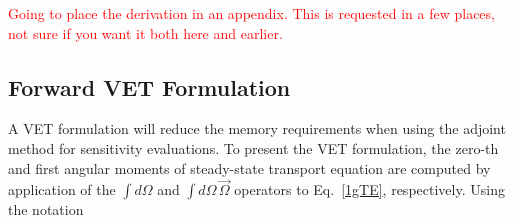 \documentclass[12pt]{report}
\newcommand{\vO}{\vec{\Omega}}
\newcommand{\comment}[2]{\marginpar{\textcolor{#2}{$\star$}}\textcolor{#2}{#1}\newline}
\newcommand{\iwh}[1]{\comment{#1}{red}}
\newcommand{\iwh}[1]{\phantom{a}}
\begin{document}
\iwh{Going to place the derivation in an appendix. This is requested in a few places, not sure if you want it both here and earlier.}

\subsection{Forward VET Formulation}

A VET formulation will reduce the memory requirements when using the adjoint method for sensitivity evaluations. To present the VET formulation, the zero-th and first angular moments of steady-state transport equation are computed by application of the $\int d \Omega$ and $\int d \Omega \, \vO$ operators to Eq.~\eqref{1gTE}, respectively. Using the notation
\end{document}
